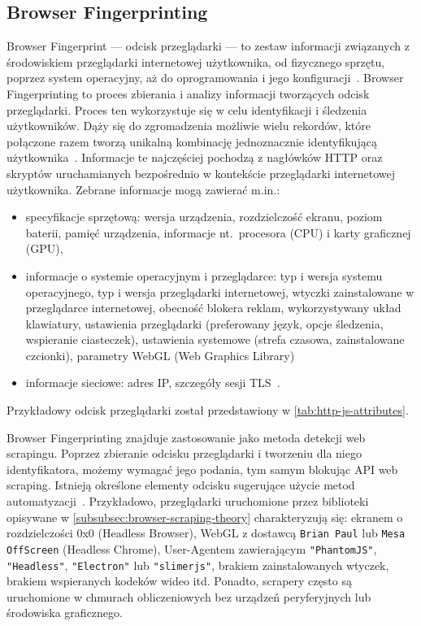 \subsection{Browser Fingerprinting}\label{subsec:browser-fingerprinting}

Browser Fingerprint --- odcisk przeglądarki --- to zestaw informacji związanych z środowiskiem przeglądarki internetowej użytkownika, od fizycznego sprzętu, poprzez system operacyjny, aż do oprogramowania i jego konfiguracji~\cite{browser-fingerprinting-a-survey}.
Browser Fingerprinting to proces zbierania i analizy informacji tworzących odcisk przeglądarki.
Proces ten wykorzystuje się w celu identyfikacji i śledzenia użytkowników.
Dąży się do zgromadzenia możliwie wielu rekordów, które połączone razem tworzą unikalną kombinację jednoznacznie identyfikującą użytkownika~\cite{fingerprint-browser-fingerprinting}.
Informacje te najczęściej pochodzą z nagłówków HTTP oraz skryptów uruchamianych bezpośrednio w kontekście przeglądarki internetowej użytkownika.
Zebrane informacje mogą zawierać m.in.:
\begin{itemize}
    \item specyfikacje sprzętową: wersja urządzenia, rozdzielczość ekranu, poziom baterii, pamięć urządzenia, informacje nt.~procesora (CPU) i karty graficznej (GPU),
    \item informacje o systemie operacyjnym i przeglądarce: typ i wersja systemu operacyjnego, typ i wersja przeglądarki internetowej, wtyczki zainstalowane w przeglądarce internetowej, obecność blokera reklam, wykorzystywany układ klawiatury, ustawienia przeglądarki (preferowany język, opcje śledzenia, wspieranie ciasteczek), ustawienia systemowe (strefa czasowa, zainstalowane czcionki), parametry WebGL (Web Graphics Library)
    \item informacje sieciowe: adres IP, szczegóły sesji TLS~\cite{browser-fingerprinting-a-survey,zitadel-browser-fingerprinting,zenrows-browser-fingerprinting,fingerprint-browser-fingerprinting}.
\end{itemize}
\noindent Przykładowy odcisk przeglądarki został przedstawiony w \autoref{tab:http-js-attributes}.

Browser Fingerprinting znajduje zastosowanie jako metoda detekcji web scrapingu.
Poprzez zbieranie odcisku przeglądarki i tworzeniu dla niego identyfikatora, możemy wymagać jego podania, tym samym blokując API web scraping.
Istnieją określone elementy odcisku sugerujące użycie metod automatyzacji~\cite{zenrows-browser-fingerprinting}.
Przykładowo, przeglądarki uruchomione przez biblioteki opisywane w \autoref{subsubsec:browser-scraping-theory} charakteryzują się:
ekranem o rozdzielczości 0x0 (Headless Browser),
WebGL z dostawcą \texttt{Brian Paul} lub \texttt{Mesa OffScreen} (Headless Chrome),
User-Agentem zawierającym \texttt{"PhantomJS"}, \texttt{"Headless"}, \texttt{"Electron"} lub \texttt{"slimerjs"},
brakiem zainstalowanych wtyczek, brakiem wspieranych kodeków wideo itd.
Ponadto, scrapery często są uruchomione w chmurach obliczeniowych bez urządzeń peryferyjnych lub środowiska graficznego.

